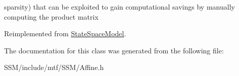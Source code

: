 sparsity) that can be exploited to gain computational savings by manually computing the product matrix 

Reimplemented from \hyperlink{classStateSpaceModel_ac956c679581e746891c62755fe715b3b}{State\-Space\-Model}.



The documentation for this class was generated from the following file\-:\begin{DoxyCompactItemize}
\item 
S\-S\-M/include/mtf/\-S\-S\-M/Affine.\-h\end{DoxyCompactItemize}
